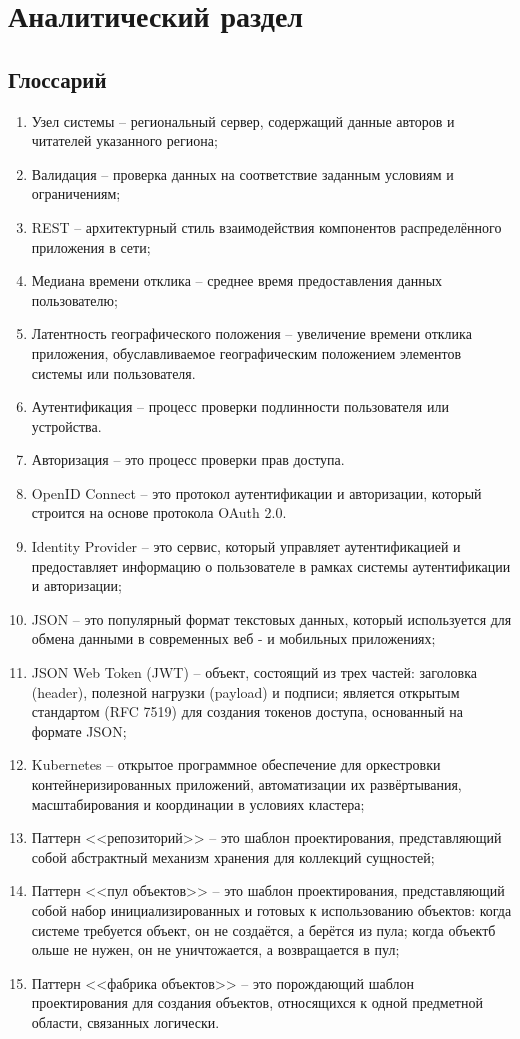 \chapter{Аналитический раздел}

\section{Глоссарий}

\begin{enumerate}
	\item Узел системы -- региональный сервер, содержащий данные авторов и читателей указанного региона;
	\item Валидация -- проверка данных на соответствие заданным условиям и ограничениям;
	\item REST -- архитектурный стиль взаимодействия компонентов распределённого
	приложения в сети;
	\item Медиана времени отклика -- среднее время предоставления данных пользователю;
	\item Латентность географического положения -- увеличение времени отклика приложения, обуславливаемое географическим положением элементов системы или
	пользователя.
	\item Аутентификация -- процесс проверки подлинности пользователя или устройства.
	\item Авторизация -- это процесс проверки прав доступа.
	\item OpenID Connect -- это протокол аутентификации и авторизации, который строится на основе протокола OAuth 2.0.
	\item Identity Provider -- это сервис, который управляет аутентификацией и предоставляет информацию о пользователе в рамках системы аутентификации и авторизации;
    \item JSON -- это популярный формат текстовых данных, который используется для обмена данными в современных веб - и мобильных приложениях;
    \item JSON Web Token (JWT) \cite{bib:jwt} -- объект, состоящий из трех частей: заголовка (header), полезной нагрузки (payload) и подписи; является открытым стандартом (RFC 7519) для создания токенов доступа, основанный на формате JSON;
    \item Kubernetes -- открытое программное обеспечение для оркестровки контейнеризированных приложений, автоматизации их развёртывания, масштабирования и координации в условиях кластера;
    \item Паттерн <<репозиторий>> -- это шаблон проектирования, представляющий собой абстрактный механизм хранения для коллекций сущностей;
    \item Паттерн <<пул объектов>> -- это шаблон проектирования, представляющий собой набор инициализированных и готовых к использованию объектов: когда системе требуется объект, он не создаётся, а берётся из пула; когда объектб ольше не нужен, он не уничтожается, а возвращается в пул;
    \item Паттерн <<фабрика объектов>> -- это порождающий шаблон проектирования для создания объектов, относящихся к одной предметной области, связанных логически.
\end{enumerate}

